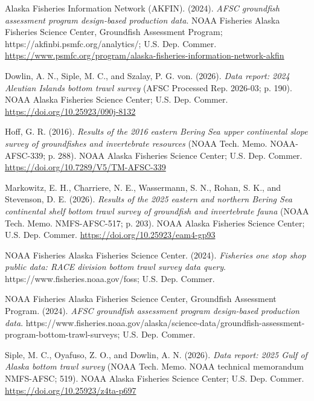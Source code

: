\documentclass[
  letterpaper,
  oneside,
  open=any]{scrbook}
\newlength{\cslhangindent}
\newenvironment{CSLReferences}[2] %
 {\begin{list}{}{%
  \setlength{\itemindent}{0pt}
  \setlength{\leftmargin}{0pt}
  \setlength{\parsep}{0pt}
  \ifodd #1
   \setlength{\leftmargin}{\cslhangindent}
   \setlength{\itemindent}{-1\cslhangindent}
  \fi
  \setlength{\itemsep}{#2\baselineskip}}}
 {\end{list}}
\begin{document}
\label{refs}
\begin{CSLReferences}{1}{0}
Alaska Fisheries Information Network (AKFIN). (2024). \emph{{AFSC}
groundfish assessment program design-based production data}. {NOAA
Fisheries Alaska Fisheries Science Center, Groundfish Assessment
Program}; https://akfinbi.psmfc.org/analytics/; {U.S. Dep. Commer.}
\url{https://www.psmfc.org/program/alaska-fisheries-information-network-akfin}

Dowlin, A. N., Siple, M. C., and Szalay, P. G. von. (2026). \emph{Data
report: 2024 {Aleutian Islands} bottom trawl survey} (AFSC Processed
Rep. 2026-03; p. 190). {NOAA Alaska Fisheries Science Center}; {U.S.
Dep. Commer.} \url{https://doi.org/10.25923/090j-8132}

Hoff, G. R. (2016). \emph{Results of the 2016 eastern {Bering Sea} upper
continental slope survey of groundfishes and invertebrate resources}
(NOAA Tech. Memo. NOAA-AFSC-339; p. 288). {NOAA Alaska Fisheries Science
Center}; {U.S. Dep. Commer.}
\url{https://doi.org/10.7289/V5/TM-AFSC-339}

Markowitz, E. H., Charriere, N. E., Wassermann, S. N., Rohan, S. K., and
Stevenson, D. E. (2026). \emph{Results of the 2025 eastern and northern
{Bering Sea} continental shelf bottom trawl survey of groundfish and
invertebrate fauna} (NOAA Tech. Memo. NMFS-AFSC-517; p. 203). {NOAA
Alaska Fisheries Science Center}; {U.S. Dep. Commer.}
\url{https://doi.org/10.25923/eam4-gp93}

NOAA Fisheries Alaska Fisheries Science Center. (2024). \emph{Fisheries
one stop shop public data: {RACE} division bottom trawl survey data
query}. https://www.fisheries.noaa.gov/foss; {U.S. Dep. Commer.}

NOAA Fisheries Alaska Fisheries Science Center, Groundfish Assessment
Program. (2024). \emph{{AFSC} groundfish assessment program design-based
production data}.
https://www.fisheries.noaa.gov/alaska/science-data/groundfish-assessment-program-bottom-trawl-surveys;
{U.S. Dep. Commer.}

Siple, M. C., Oyafuso, Z. O., and Dowlin, A. N. (2026). \emph{Data
report: 2025 {Gulf of Alaska} bottom trawl survey} (NOAA Tech. Memo.
NOAA technical memorandum NMFS-AFSC; 519). {NOAA Alaska Fisheries
Science Center}; {U.S. Dep. Commer.}
\url{https://doi.org/10.25923/z4ta-p697}

\end{CSLReferences}
\end{document}
